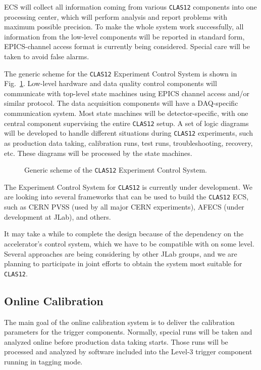 ECS will collect all information coming from various {\tt CLAS12} components
into one processing center, which will perform analysis and report problems 
with maximum possible precision.  To make the whole system work successfully,
all information from the low-level components will be reported in standard 
form, EPICS-channel access format is currently being considered.  Special 
care will be taken to avoid false alarms.

The generic scheme for the {\tt CLAS12} Experiment Control System is shown 
in Fig.~\ref{fig:MON1}.  Low-level hardware and data quality control 
components will communicate with top-level state machines using EPICS channel 
access and/or similar protocol.  The data acquisition components will have 
a DAQ-specific communication system.  Most state machines will be 
detector-specific, with one central component supervising the entire 
{\tt CLAS12} setup. A set of logic diagrams will be developed to handle 
different situations during {\tt CLAS12} experiments, such as production 
data taking, calibration runs, test runs, troubleshooting, recovery, etc. 
These diagrams will be processed by the state machines.

\begin{figure}[ht]
\vspace{100mm}
\caption{\small{Generic scheme of the {\tt CLAS12} Experiment Control System.}}
\label{fig:MON1} 
\end{figure}

The Experiment Control System for {\tt CLAS12} is currently under development.
We are looking into several frameworks that can be used to build the
{\tt CLAS12} ECS, such as CERN PVSS (used by all major CERN experiments), 
AFECS (under development at JLab), and others.

It may take a while to complete the design because of the dependency on 
the accelerator's control system, which we have to be compatible with on 
some level.  Several approaches are being considering by other JLab groups, 
and we are planning to participate in joint efforts to obtain the system
most suitable for {\tt CLAS12}. 

\subsection{Online Calibration}

The main goal of the online calibration system is to deliver the calibration 
parameters for the trigger components.  Normally, special runs will be taken 
and analyzed online before production data taking starts.  Those runs will be 
processed and analyzed by software included into the Level-3 trigger 
component running in tagging mode.
